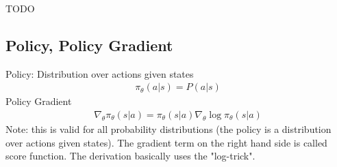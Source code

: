 TODO


\subsection{Policy, Policy Gradient}

Policy: Distribution over actions given states
\renewcommand{\policy}[2]{\pi_\theta (#1 | #2)}
\begin{align}
	\policy{a}{s} = P(a | s)
\end{align}
Policy Gradient
\begin{align}
	\nabla_\theta \policy{s}{a} = \policy{s}{a} \nabla_\theta \log \policy{s}{a}
\end{align}
Note: this is valid for all probability distributions (the policy is a distribution over actions given states). The gradient term on the right hand side is called score function. The derivation basically uses the "log-trick".